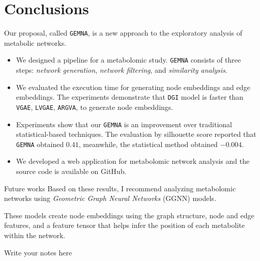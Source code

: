 \documentclass[aspectratio=169]{beamer}
\begin{document}
\section{Conclusions}
    Our proposal, called \texttt{GEMNA}, is a new approach to the exploratory analysis of metabolic networks.
    \begin{itemize}
        \item We designed a pipeline for a metabolomic study. \texttt{GEMNA} consists of three steps: \textit{network generation}, \textit{network filtering}, and \textit{similarity analysis}.

        \item We evaluated the execution time for generating node embeddings and edge embeddings. The experiments demonstrate that \texttt{DGI} model is faster than \texttt{VGAE}, \texttt{LVGAE}, \texttt{ARGVA}, to generate node embeddings. %

        \item Experiments show that our \texttt{GEMNA} is an improvement over traditional statistical-based techniques. The evaluation by silhouette score reported that \texttt{GEMNA} obtained $0.41$, meanwhile, the statistical method obtained $-0.004$. %

        \item We developed a web application for metabolomic network analysis and the source code is available on GitHub.
    \end{itemize}

\begin{frame}{Future works}
    Based on these results, I recommend analyzing metabolomic networks using \textit{Geometric Graph Neural Networks} (GGNN) models.

    These models create node embeddings using the graph structure, node and edge features, and a feature tensor that helps infer the position of each metabolite within the network.
    
    \begin{note}
        {Write your notes here}
    \end{note}
\end{frame}
\end{document}
